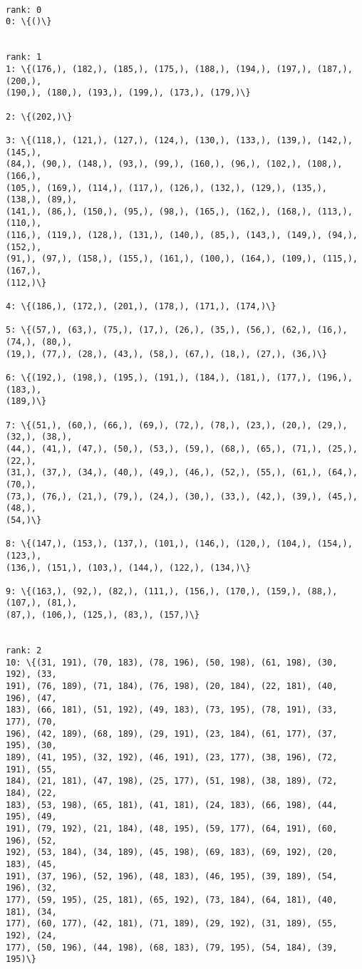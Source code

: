 \documentclass[11pt]{article}
\begin{document}
    \begin{Verbatim}[commandchars=\\\{\}]

rank: 0
0: \{()\}


rank: 1
1: \{(176,), (182,), (185,), (175,), (188,), (194,), (197,), (187,), (200,),
(190,), (180,), (193,), (199,), (173,), (179,)\}

2: \{(202,)\}

3: \{(118,), (121,), (127,), (124,), (130,), (133,), (139,), (142,), (145,),
(84,), (90,), (148,), (93,), (99,), (160,), (96,), (102,), (108,), (166,),
(105,), (169,), (114,), (117,), (126,), (132,), (129,), (135,), (138,), (89,),
(141,), (86,), (150,), (95,), (98,), (165,), (162,), (168,), (113,), (110,),
(116,), (119,), (128,), (131,), (140,), (85,), (143,), (149,), (94,), (152,),
(91,), (97,), (158,), (155,), (161,), (100,), (164,), (109,), (115,), (167,),
(112,)\}

4: \{(186,), (172,), (201,), (178,), (171,), (174,)\}

5: \{(57,), (63,), (75,), (17,), (26,), (35,), (56,), (62,), (16,), (74,), (80,),
(19,), (77,), (28,), (43,), (58,), (67,), (18,), (27,), (36,)\}

6: \{(192,), (198,), (195,), (191,), (184,), (181,), (177,), (196,), (183,),
(189,)\}

7: \{(51,), (60,), (66,), (69,), (72,), (78,), (23,), (20,), (29,), (32,), (38,),
(44,), (41,), (47,), (50,), (53,), (59,), (68,), (65,), (71,), (25,), (22,),
(31,), (37,), (34,), (40,), (49,), (46,), (52,), (55,), (61,), (64,), (70,),
(73,), (76,), (21,), (79,), (24,), (30,), (33,), (42,), (39,), (45,), (48,),
(54,)\}

8: \{(147,), (153,), (137,), (101,), (146,), (120,), (104,), (154,), (123,),
(136,), (151,), (103,), (144,), (122,), (134,)\}

9: \{(163,), (92,), (82,), (111,), (156,), (170,), (159,), (88,), (107,), (81,),
(87,), (106,), (125,), (83,), (157,)\}


rank: 2
10: \{(31, 191), (70, 183), (78, 196), (50, 198), (61, 198), (30, 192), (33,
191), (76, 189), (71, 184), (76, 198), (20, 184), (22, 181), (40, 196), (47,
183), (66, 181), (51, 192), (49, 183), (73, 195), (78, 191), (33, 177), (70,
196), (42, 189), (68, 189), (29, 191), (23, 184), (61, 177), (37, 195), (30,
189), (41, 195), (32, 192), (46, 191), (23, 177), (38, 196), (72, 191), (55,
184), (21, 181), (47, 198), (25, 177), (51, 198), (38, 189), (72, 184), (22,
183), (53, 198), (65, 181), (41, 181), (24, 183), (66, 198), (44, 195), (49,
191), (79, 192), (21, 184), (48, 195), (59, 177), (64, 191), (60, 196), (52,
192), (53, 184), (34, 189), (45, 198), (69, 183), (69, 192), (20, 183), (45,
191), (37, 196), (52, 196), (48, 183), (46, 195), (39, 189), (54, 196), (32,
177), (59, 195), (25, 181), (65, 192), (73, 184), (64, 181), (40, 181), (34,
177), (60, 177), (42, 181), (71, 189), (29, 192), (31, 189), (55, 192), (24,
177), (50, 196), (44, 198), (68, 183), (79, 195), (54, 184), (39, 195)\}


\end{Verbatim}
\end{document}
